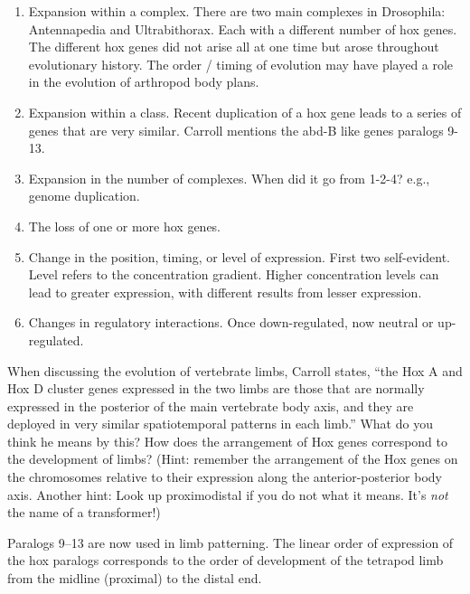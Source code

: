 \documentclass[11pt, addpoints]{exam}
\begin{document}
\begin{questions}
\begin{solution}
	\begin{enumerate}
	\item Expansion within a complex. There are two main complexes in Drosophila: Antennapedia and Ultrabithorax.  Each with a different number of hox genes.  The different hox genes did not arise all at one time but arose throughout evolutionary history.  The order / timing of evolution may have played a role in the evolution of arthropod body plans.
	
	\item Expansion within a class. Recent duplication of a hox gene leads to a series of genes that are very similar.  Carroll mentions the abd-B like genes paralogs 9-13.
	
	\item Expansion in the number of complexes.  When did it go from 1-2-4? e.g., genome duplication.
	
	\item The loss of one or more hox genes.
	
	\item Change in the position, timing, or level of expression.  First two self-evident.  Level refers to the concentration gradient.  Higher concentration levels can lead to greater expression, with different results from lesser expression.
	
	\item Changes in regulatory interactions.  Once down-regulated, now neutral or up-regulated.
	\end{enumerate}
\end{solution}


\question[5]
When discussing the evolution of vertebrate limbs, Carroll states,
  ``the Hox A and Hox D cluster genes expressed in the two limbs are
  those that are normally expressed in the posterior of the main
  vertebrate body axis, and they are deployed in very similar
  spatiotemporal patterns in each limb.'' What do you think he means by
  this? How does the arrangement of Hox genes correspond to the
  development of limbs? (Hint: remember the arrangement of the Hox genes
  on the chromosomes relative to their expression along the
  anterior-posterior body axis. Another hint: Look up proximodistal if
  you do not what it means. It's \emph{not} the name of a transformer!)

\begin{solution}
Paralogs 9–13 are now used in limb patterning.  The linear order of expression of the hox paralogs corresponds to the order of development of the tetrapod limb from the midline (proximal) to the distal end.
\end{solution}


\end{questions}
\end{document}
